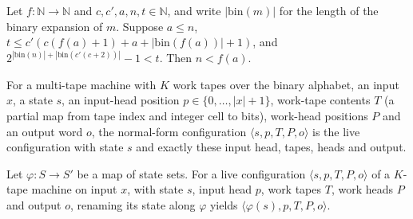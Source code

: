 \begin{theorem}
\label{Turing.NTimeDiag.qy_timeout_cert}
\leanok
{}
Let $f : \mathbb{N} \to \mathbb{N}$ and $c, c', a, n, t \in \mathbb{N}$, and write
$|\mathrm{bin}(m)|$ for the length of the binary expansion of $m$. Suppose $a \le n$,
$t \le c'(c(f(a) + 1) + a + |\mathrm{bin}(f(a))| + 1)$, and
$2^{|\mathrm{bin}(n)| + |\mathrm{bin}(c'(c+2))|} - 1 < t$. Then $n < f(a)$.
\end{theorem}

\begin{definition}
\label{Turing.NTimeDiag.qyC}
\leanok
{}
For a multi-tape machine with $K$ work tapes over the binary alphabet, an input $x$, a state $s$,
an input-head position $p \in \{0, \dots, |x| + 1\}$, work-tape contents $T$ (a partial map from
tape index and integer cell to bits), work-head positions $P$ and an output word $o$, the
normal-form configuration $\langle s, p, T, P, o \rangle$ is the live configuration with state
$s$ and exactly these input head, tapes, heads and output.
\end{definition}

\begin{theorem}
\label{Turing.NTimeDiag.qyC_mapState}
\leanok
{}
Let $\varphi : S \to S'$ be a map of state sets. For a live configuration
$\langle s, p, T, P, o \rangle$ of a $K$-tape machine on input $x$, with state $s$, input head
$p$, work tapes $T$, work heads $P$ and output $o$, renaming its state along $\varphi$ yields
$\langle \varphi(s), p, T, P, o \rangle$.
\end{theorem}

